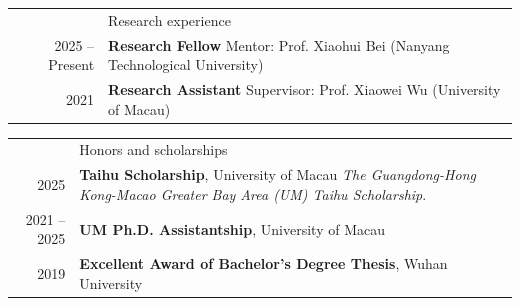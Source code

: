 \documentclass[letterpaper, 11pt]{article}
\newcommand{\headingfont}{\Large\color{OliveGreen}}
\newenvironment{SectionTable}[1]{
	\renewcommand*{\arraystretch}{1.2}
	\setlength{\tabcolsep}{8pt}
	\begin{longtable}{Rp{6.2in}} & #1 \\}
{\end{longtable}\vspace{-.7cm}}
\newenvironment{SectionTableSingleSpace}[1]{
	\renewcommand*{\arraystretch}{1.2}
	\setlength{\tabcolsep}{8pt}
	\begin{longtable}{Rp{6.2in}} & #1 \\[0.6em]}
{\end{longtable}\vspace{-.7cm}}
\begin{document}

\begin{SectionTable}{\headingfont Research experience}

2025 -- Present &
\textbf{Research Fellow} \newline
Mentor: Prof. Xiaohui Bei (Nanyang Technological University)\\

2021 &
\textbf{Research Assistant} \newline
Supervisor: Prof. Xiaowei Wu (University of Macau)\\
\end{SectionTable}


\begin{SectionTableSingleSpace}{\headingfont Honors and scholarships}
2025 & 
\textbf{Taihu Scholarship}, University of Macau\newline
\textit{The Guangdong-Hong Kong-Macao Greater Bay Area (UM) Taihu Scholarship}. \\

2021 -- 2025 &
\textbf{UM Ph.D. Assistantship}, University of Macau\\

2019 &
\textbf{Excellent Award of Bachelor's Degree Thesis}, Wuhan University\\
\end{SectionTableSingleSpace}

\end{document}
